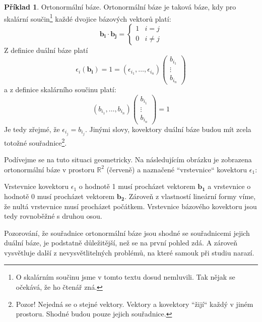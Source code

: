 \documentclass[a5paper,12pt]{amsbook}
\theoremstyle{definition}
\newtheorem{example}{Příklad}[chapter]
\newcommand{\myvec}[1]{\bm{#1}}
\newcommand{\mymap}[1]{#1}
\begin{document}
\begin{example}\label{example:covector1}Ortonormální báze. Ortonormální báze je taková báze,
kdy pro skalární součin\footnote{
  O skalárním součinu jsme v tomto textu dosud nemluvili. Tak nějak se očekává, že ho čtenář
  zná.
} každé dvojice bázových vektorů platí:
\begin{equation*}
\myvec{b_i}\cdot\myvec{b_j} = 
\begin{cases}
1 & i = j\\
0 & i \neq j
\end{cases}
\end{equation*}
Z definice duální báze platí
\begin{equation*}
\mymap{\epsilon_i}(\myvec{b_i}) = 1 = \left(\epsilon_{i_1}, \ldots, \epsilon_{i_n}\right)
\left(\begin{array}{c}
b_{i_1} \\
\vdots \\
b_{i_n}\end{array}\right)
\end{equation*}
a z definice skalárního součinu platí:
\begin{equation*}
\left(b_{i_1}, \ldots, b_{i_n}\right)
\left(\begin{array}{c}
b_{i_1} \\
\vdots \\
b_{i_n}\end{array}\right) = 1
\end{equation*}
Je tedy zřejmé, že $\epsilon_{i_j} = b_{i_j}$. Jinými slovy, kovektory duální báze budou mít
zcela totožné souřadnice\footnote{
  Pozor! Nejedná se o stejné vektory. Vektory a kovektory ``žijí`` každý v jiném prostoru.
  Shodné budou pouze jejich souřadnice.
}.

Podívejme se na tuto situaci geometricky. Na následujícím obrázku je zobrazena ortonormální
báze v prostoru $\mathbb{R}^2$ (červeně) a naznačené ``vrstevnice`` kovektoru $\mymap{\epsilon_1}$:
\begin{center}

\end{center}
Vrstevnice kovektoru $\mymap{\epsilon_1}$ o hodnotě 1 musí procházet vektorem $\myvec{b_1}$
a vrstevnice o hodnotě 0 musí procházet vektorem $\myvec{b_2}$. Zároveň z vlastností lineární
formy víme, že nultá vrstevnice musí procházet počátkem. Vrstevnice bázového kovektoru jsou
tedy rovnoběžné s druhou osou.

\medskip\noindent
Pozorování, že souřadnice ortonormální báze jsou shodné se souřadnicemi jejich duální báze,
je podstatně důležitější, než se na první pohled zdá. A zároveň vysvětluje další
z nevysvětlitelných problémů, na které samouk při studiu narazí.


\end{example}
\end{document}
